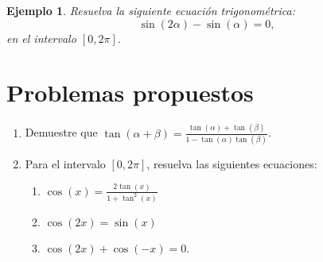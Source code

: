 \documentclass[10pt]{article}
\newcommand{\2}[1]{\hspace{-0.93cm}\colorbox{color1}{\hspace{0.07cm} \parbox{17cm}{\vspace{0.2cm} #1}\hspace*{0.07cm} }}
\newcommand{\3}[1]{\hspace{-0.93cm}\colorbox{color7}{\hspace{0.07cm} \parbox{17cm}{\vspace{0.2cm} #1}\hspace*{0.07cm} }}
\theoremstyle{theorem}
\newtheorem{eje}{Ejemplo}%
\numberwithin{equation}{section}
\newcommand{\dis}{\displaystyle}
\begin{document}
\begin{eje}
Resuelva la siguiente ecuaci\'on trigonom\'etrica: $$\sin(2\alpha)-\sin(\alpha)=0,$$ en el intervalo $[0,2\pi]$.
\end{eje}

\section{Problemas propuestos}

\begin{enumerate}[P1.]
    \item Demuestre que $\dis \tan(\alpha+\beta)=\frac{\tan(\alpha)+\tan(\beta)}{1-\tan(\alpha)\tan(\beta)}$.
    \item Para el intervalo $[0,2\pi]$, resuelva las siguientes ecuaciones:
    \begin{enumerate}[1.]
       \item $\dis \cos(x)=\frac{2\tan(x)}{1+\tan^2(x)}$
       \item $\cos(2x)=\sin(x)$
       \item $\cos(2x)+\cos(-x)=0$.
    \end{enumerate}     
\end{enumerate}
\end{document}
